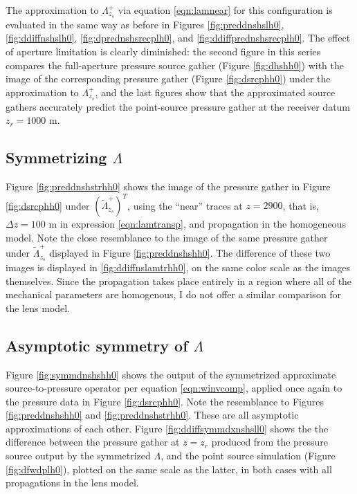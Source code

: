 The approximation to $\Lambda_{z_s}^+$ via equation \ref{eqn:lamnear}
for this configuration is evaluated in the same way as before in
Figures \ref{fig:preddnshslh0}, \ref{fig:ddiffnshslh0},
\ref{fig:dprednshsrecplh0}, and \ref{fig:ddiffprednshsrecplh0}. The effect of aperture
limitation is clearly diminished: the second figure in this series
compares the full-aperture pressure source gather (Figure
\ref{fig:dhshh0}) with the 
image of the corresponding pressure gather (Figure \ref{fig:dsrcphh0})
under the approximation to $\Lambda_{z_s}^+$, and the last figures
show that the approximated source gathers accurately predict the
point-source pressure gather at the receiver datum $z_r=1000$ m.

\subsection{Symmetrizing $\Lambda$}

Figure \ref{fig:preddnshstrhh0} shows the image of the pressure gather
in Figure \ref{fig:dsrcphh0} under $(\tilde{\Lambda}^+_{z_s})^T$,
using the ``near'' traces at $z=2900$, that is, $\Delta z = 100$ m in
expression \ref{eqn:lamtransp}, and propagation in the
homogeneous model. Note
the close resemblance to the image of the same pressure gather under
$\tilde{\Lambda}^+_{z_s}$ displayed in Figure
\ref{fig:preddnshshh0}. The difference of these two images is
displayed in \ref{fig:ddiffnslamtrhh0}, on the same color scale as the
images themselves. Since the propagation takes place entirely in a
region where all of the mechanical parameters are homogenous, I do not
offer a similar comparison for the lens model.

\subsection{Asymptotic symmetry of $\Lambda$}

Figure \ref{fig:symmdnshshh0} shows the output of the symmetrized
approximate source-to-pressure operator per equation \ref{eqn:winvcomp},
applied once again to the pressure data in Figure
\ref{fig:dsrcphh0}. Note the resemblance to Figures
\ref{fig:preddnshshh0} and \ref{fig:preddnshstrhh0}. These are all
asymptotic approximations of each other. Figure
\ref{fig:ddiffsymmdxnshsll0} shows the
 the difference between the pressure gather at $z=z_r$ produced from
 the pressure source output by the symmetrized $\Lambda$, and the point source
simulation (Figure \ref{fig:dfwdplh0}), plotted on the same scale as
the latter, in both cases with all propagations in the lens model.

